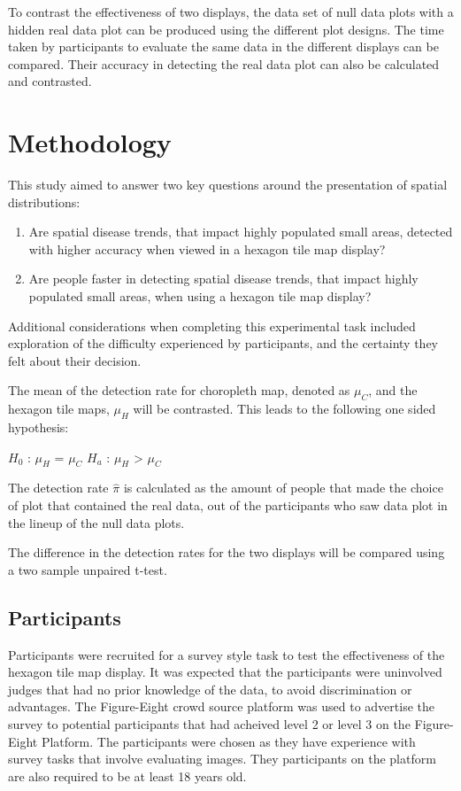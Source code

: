 \documentclass[conference,final,]{IEEEtran}
\begin{document}
To contrast the effectiveness of two displays, the data set of null data plots with a hidden real data plot can be produced using the different plot designs.
The time taken by participants to evaluate the same data in the different displays can be compared. Their accuracy in detecting the real data plot can also be calculated and contrasted.

\hypertarget{methodology}{%
\section{Methodology}\label{methodology}}

This study aimed to answer two key questions around the presentation of spatial distributions:

\begin{enumerate}
\def\labelenumi{\arabic{enumi}.}
\item
  Are spatial disease trends, that impact highly populated small areas, detected with higher accuracy when viewed in a hexagon tile map display?
\item
  Are people faster in detecting spatial disease trends, that impact highly populated small areas, when using a hexagon tile map display?
\end{enumerate}

Additional considerations when completing this experimental task included exploration of the difficulty experienced by participants, and the certainty they felt about their decision.

The mean of the detection rate for choropleth map, denoted as \(\mu_C\), and the hexagon tile maps, \(\mu_H\) will be contrasted. This leads to the following one sided hypothesis:

\(H_0\) : \(\mu_H\) = \(\mu_C\)
\(H_a\) : \(\mu_H\) \textgreater{} \(\mu_C\)

The detection rate \(\hat\pi\) is calculated as the amount of people that made the choice of plot that contained the real data, out of the participants who saw data plot in the lineup of the null data plots.

The difference in the detection rates for the two displays will be compared using a two sample unpaired t-test.

\hypertarget{participants}{%
\subsection{Participants}\label{participants}}

Participants were recruited for a survey style task to test the effectiveness of the hexagon tile map display.
It was expected that the participants were uninvolved judges that had no prior knowledge of the data, to avoid discrimination or advantages.
The Figure-Eight crowd source platform was used to advertise the survey to potential participants that had acheived level 2 or level 3 on the Figure-Eight Platform.
The participants were chosen as they have experience with survey tasks that involve evaluating images. They participants on the platform are also required to be at least 18 years old.
\end{document}
